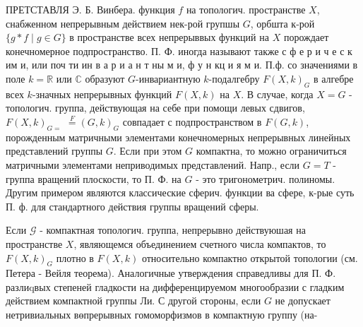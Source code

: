 \documentclass[10pt]{article}
\begin{document}
ПРЕТСТАВЛЯ Э. Б. Винбера. функция $f$ на топологич. пространстве $X$, снабженном непрерывным действием нек-рой групшы $G$, орбшта к-рой $\{g * f \mid g \in G\}$ в пространстве всех непрерыввых функций на $X$ порождает конечномерное подпространство. П. Ф. иногда называют также с ф е р и ч е с к им и, или поч ти ин в а р и а н т ны м и, ф у н кц и я м и. П.ф. со значениями в поле $k=\mathbb{R}$ или $\mathbb{C}$ образуют $G$-инвариантную $k$-подалгебру $F(X, k)_{G}$ в алгебре всех $k$-значных непрерывных функций $F(X, k)$ на $X$. В случае, когда $X=G$ - топологич. группа, действующая на себе при помощи левых сдвигов, $F(X, k)_{G=}$ $\stackrel{F}{=}(G, k)_{G}$ совпадает с подпространством в $F(G, k)$, порожденным матричными элементами конечномерных непрерывных линейных представлений группы $G$. Если при этом $G$ компактна, то можно ограничиться матричными элементами неприводимых представлений. Напр., если $G=T$ - группа вращений плоскости, то П. Ф. на $G$ - это тригонометрич. полиномы. Другим примером являются классические сферич. функции ва сфере, к-рые суть П. ф. для стандартного действия группы вращений сферы.



Если $\mathcal{G}$ - компактная топологич. группа, непрерывно действуюшая на пространстве $X$, являющемся объединением счетного числа компактов, то $F(X, k)_{G}$ плотно в $F(X, k)$ относительно компактно открытой топологии (см. Петера - Вейля теорема). Аналогичные утверждения справедливы для П. Ф. разлиqвых степеней гладкости на дифференцируемом многообразии с гладким действием компактной группы Ли. С другой стороны, если $G$ не допускает нетривиальных вөпрерывных гомоморфизмов в компактную группу (на-
\end{document}
